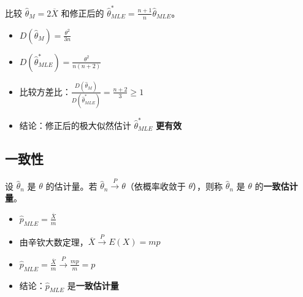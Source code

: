 \begin{example}
比较 $\hat{\theta}_M = 2\overline{X}$ 和修正后的 $\hat{\theta}_{MLE}^* = \frac{n+1}{n}\hat{\theta}_{MLE}$。
\begin{itemize}
	\item $D(\hat{\theta}_M) = \frac{\theta^2}{3n}$
	\item $D(\hat{\theta}_{MLE}^*) = \frac{\theta^2}{n(n+2)}$
	\item 比较方差比：$\frac{D(\hat{\theta}_M)}{D(\hat{\theta}_{MLE}^*)} = \frac{n+2}{3} \ge 1$
	\item 结论：修正后的极大似然估计 $\hat{\theta}_{MLE}^*$ \textbf{更有效}
\end{itemize}
\end{example}

\subsection{一致性}
\begin{definition}[一致性]
设 $\hat{\theta}_n$ 是 $\theta$ 的估计量。若 $\hat{\theta}_n \xrightarrow{P} \theta$（依概率收敛于 $\theta$），则称 $\hat{\theta}_n$ 是 $\theta$ 的\textbf{一致估计量}。
\end{definition}

\begin{example}
\begin{itemize}
	\item $\hat{p}_{MLE} = \frac{\overline{X}}{m}$
	\item 由辛钦大数定理，$\overline{X} \xrightarrow{P} E(X) = mp$
	\item $\hat{p}_{MLE} = \frac{\overline{X}}{m} \xrightarrow{P} \frac{mp}{m} = p$
	\item 结论：$\hat{p}_{MLE}$ 是\textbf{一致估计量}
\end{itemize}
\end{example}

